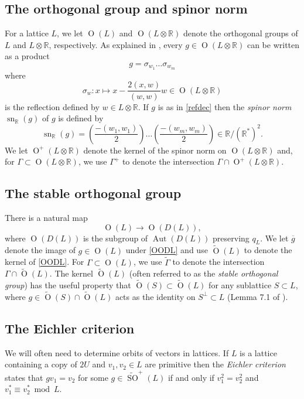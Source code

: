 \documentclass[11pt]{article}
\newcommand{\RR}{\mathbb{R}}
\newcommand{\opn}{\operatorname}
\newcommand{\beq}{\begin{equation*}}
\newcommand{\eeq}{\end{equation*}}
\begin{document}
\subsection{The orthogonal group and spinor norm}
For a lattice $L$, we let $\opn{O}(L)$ and $\opn{O}(L \otimes \RR)$ denote the orthogonal groups of $L$ and $L \otimes \RR$, respectively.
As explained in  \cite{cassels}, every $g \in \opn{O}(L \otimes \RR)$ can be written as a product
\begin{equation}\label{refdec}
  g = \sigma_{w_1} \ldots \sigma_{w_m}
\end{equation}
where
\beq
\sigma_w: x \mapsto x - \frac{2(x,w)}{(w,w)}w \in \opn{O}(L \otimes \RR)
\eeq
is the reflection defined by $w \in L \otimes \RR$.
If $g$ is as in \eqref{refdec} then the \emph{spinor norm} $\opn{sn}_{\RR}(g)$ of $g$ is defined by \cite{Kneser}
\beq
\opn{sn}_{\RR}(g) =
  \left ( \frac{-(w_1, w_1)}{2} \right )
  \ldots
    \left ( \frac{-(w_m, w_m)}{2} \right )
\in \RR/(\RR^*)^2.
\eeq
We let $\opn{O}^+(L \otimes \RR)$ denote the kernel of the spinor norm on $\opn{O}(L \otimes \RR)$ and, for  $\Gamma \subset \opn{O}(L \otimes \RR)$, we use $\Gamma^+$ to denote the intersection $\Gamma \cap \opn{O}^+(L \otimes \RR)$.
\subsection{The stable orthogonal group}
There is a natural map
\begin{equation}\label{OODL}
\opn{O}(L) \rightarrow \opn{O}(D(L)),
\end{equation}
where $\opn{O}(D(L))$ is the subgroup of $\opn{Aut}(D(L))$ preserving $q_L$.
We let $\overline{g}$ denote the image of $g \in \opn{O}(L)$ under \eqref{OODL} and use $\widetilde{\opn{O}}(L)$ to denote the kernel of \eqref{OODL}.
For $\Gamma \subset \opn{O}(L)$, we use $\widetilde{\Gamma}$ to denote the intersection $\Gamma \cap \widetilde{\opn{O}}(L)$. 
The kernel  $\widetilde{\opn{O}}(L)$ (often referred to as the \emph{stable orthogonal group}) has the useful property that  $\widetilde{\opn{O}}(S) \subset \widetilde{\opn{O}}(L)$ for any sublattice $S \subset L$, where $g \in \widetilde{\opn{O}}(S) \cap \widetilde{\opn{O}}(L)$ acts as the identity on $S^{\perp} \subset L$ (Lemma 7.1 of \cite{handbook}).
\subsection{The Eichler criterion}
We will often need to determine orbits of vectors in lattices.
If $L$ is a lattice containing a copy of $2U$ and $v_1, v_2 \in L$ are primitive then the \emph{Eichler criterion} \cite{handbook} states that  $g v_1 = v_2$ for some $g \in \widetilde{\opn{SO}}^+(L)$ if and only if $v_1^2 = v_2^2$ and $v_1^* \equiv v_2^* \bmod{ L}$.
\end{document}
